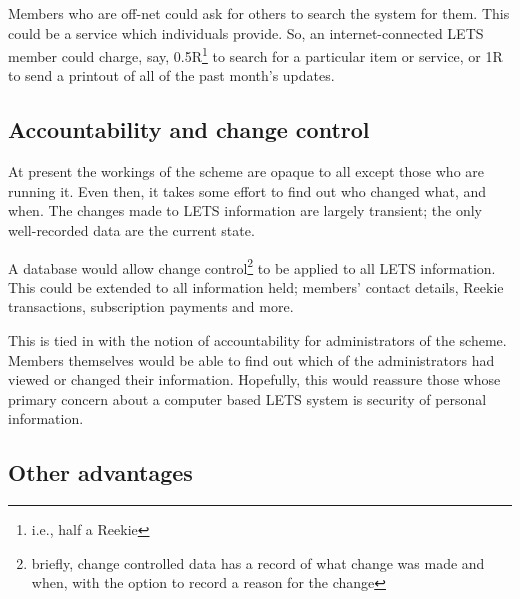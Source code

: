 \documentclass[a4paper,11pt]{article}
\begin{document}
Members who are off-net could ask for others to search the system for them. This could be a service which individuals provide. So, an internet-connected LETS member could charge, say, 0.5R\footnote{i.e., half a Reekie} to search for a particular item or service, or 1R to send a printout of all of the past month's updates.



\subsection{Accountability and change control}

At present the workings of the scheme are opaque to all except those who are running it. Even then, it takes some effort to find out who changed what, and when. The changes made to LETS information are largely transient; the only well-recorded data are the current state.

A database would allow change control\footnote{briefly, change controlled data has a record of what change was made and when, with the option to record a reason for the change} to be applied to all LETS information. This could be extended to all information held; members' contact details, Reekie transactions, subscription payments and more.

This is tied in with the notion of accountability for administrators of the scheme. Members themselves would be able to find out which of the administrators had viewed or changed their information. Hopefully, this would reassure those whose primary concern about a computer based LETS system is security of personal information.

\subsection{Other advantages}
\end{document}

